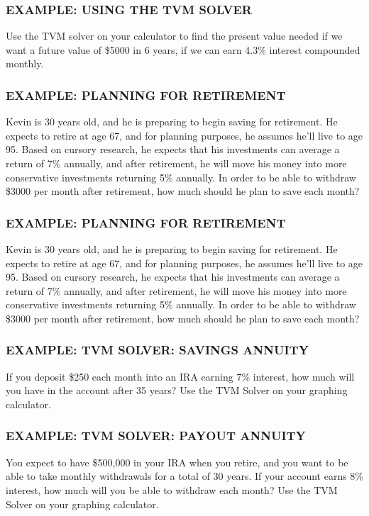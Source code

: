 \documentclass[8pt]{beamer}
\newcommand{\extitle}[1]{\frametitle{\fontfamily{fvs}\selectfont \small\color{black!70!blue!80!cyan}\uppercase{\bfseries Example: #1}}}
\def\solblank{\begin{tcolorbox}[colframe=black!50!blue!50!cyan,
colback=white,
bottomrule=0mm,
rightrule=0mm,
sharp corners=all] 
\vspace{6in}
\text{}
\end{tcolorbox}}
\begin{document}
\begin{frame}
\extitle{Using the TVM Solver}
\text{}
\vfill
\begin{center}
\parbox{3in}{\Large Use the TVM solver on your calculator to find the present value needed if we want a future value of \$5000 in 6 years, if we can earn 4.3\% interest compounded monthly.}
\end{center}
\vfill
\text{}
\end{frame}

\begin{frame}
\extitle{Planning for Retirement}
Kevin is 30 years old, and he is preparing to begin saving for retirement.  He expects to retire at age 67, and for planning purposes, he assumes he'll live to age 95.  Based on cursory research, he expects that his investments can average a return of 7\% annually, and after retirement, he will move his money into more conservative investments returning 5\% annually.  In order to be able to withdraw \$3000 per month after retirement, how much should he plan to save each month?

\solblank
\end{frame}

\begin{frame}
\extitle{Planning for Retirement}
Kevin is 30 years old, and he is preparing to begin saving for retirement.  He expects to retire at age 67, and for planning purposes, he assumes he'll live to age 95.  Based on cursory research, he expects that his investments can average a return of 7\% annually, and after retirement, he will move his money into more conservative investments returning 5\% annually.  In order to be able to withdraw \$3000 per month after retirement, how much should he plan to save each month?

\solblank
\end{frame}

\begin{frame}
\extitle{TVM Solver: Savings Annuity}
\text{}
\vfill
\begin{center}
\parbox{3in}{\Large If you deposit \$250 each month into an IRA earning 7\% interest, how much will you have in the account after 35 years?  Use the TVM Solver on your graphing calculator.}
\end{center}
\vfill
\text{}
\end{frame}

\begin{frame}
\extitle{TVM Solver: Payout Annuity}
\text{}
\vfill
\begin{center}
\parbox{3in}{\Large You expect to have \$500,000 in your IRA when you retire, and you want to be able to take monthly withdrawals for a total of 30 years.  If your account earns 8\% interest, how much will you be able to withdraw each month?  Use the TVM Solver on your graphing calculator.}
\end{center}
\vfill
\text{}
\end{frame}
\end{document}
